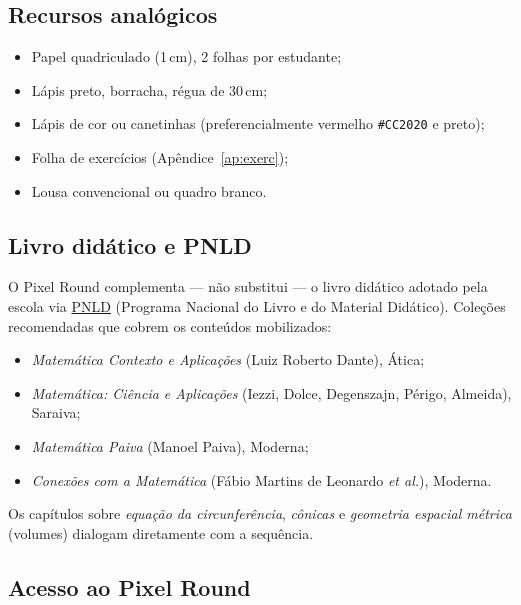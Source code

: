 \documentclass[12pt,a4paper]{scrartcl}
\begin{document}
\subsection{Recursos analógicos}
\begin{itemize}[leftmargin=1.3em,itemsep=0.15em,topsep=0.3em]
  \item Papel quadriculado (1\,cm), 2 folhas por estudante;
  \item Lápis preto, borracha, régua de 30\,cm;
  \item Lápis de cor ou canetinhas (preferencialmente vermelho \texttt{\#CC2020} e preto);
  \item Folha de exercícios (Apêndice~\ref{ap:exerc});
  \item Lousa convencional ou quadro branco.
\end{itemize}

\subsection{Livro didático e PNLD}\label{sec:pnld}

O Pixel Round complementa --- não substitui --- o livro didático adotado pela escola via \href{https://www.gov.br/fnde/pt-br/acesso-a-informacao/acoes-e-programas/programas/programas-do-livro}{PNLD} (Programa Nacional do Livro e do Material Didático). Coleções recomendadas que cobrem os conteúdos mobilizados:

\begin{itemize}[leftmargin=1.3em,itemsep=0.1em,topsep=0.2em,nosep]
  \item \emph{Matemática Contexto e Aplicações} (Luiz Roberto Dante), Ática;
  \item \emph{Matemática: Ciência e Aplicações} (Iezzi, Dolce, Degenszajn, Périgo, Almeida), Saraiva;
  \item \emph{Matemática Paiva} (Manoel Paiva), Moderna;
  \item \emph{Conexões com a Matemática} (Fábio Martins de Leonardo \emph{et al.}), Moderna.
\end{itemize}

Os capítulos sobre \emph{equação da circunferência}, \emph{cônicas} e \emph{geometria espacial métrica} (volumes) dialogam diretamente com a sequência.

\subsection{Acesso ao Pixel Round}
\end{document}
